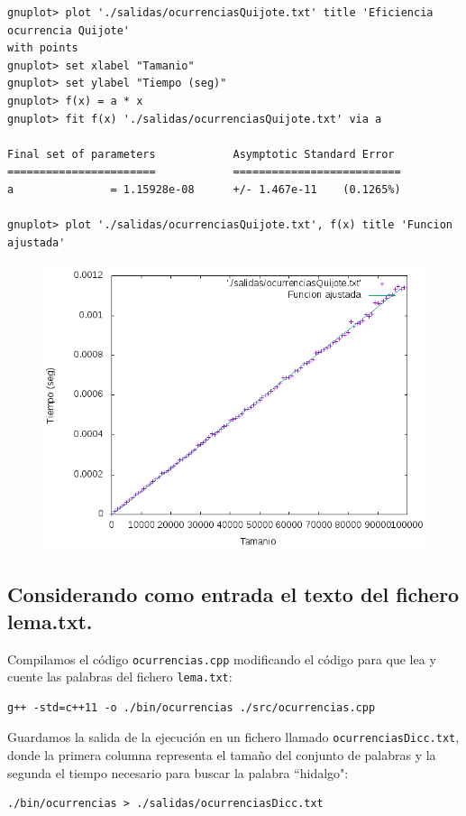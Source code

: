 \documentclass[11pt]{article}
\begin{document}
\begin{verbatim}
gnuplot> plot './salidas/ocurrenciasQuijote.txt' title 'Eficiencia ocurrencia Quijote' 
with points
gnuplot> set xlabel "Tamanio"
gnuplot> set ylabel "Tiempo (seg)"
gnuplot> f(x) = a * x
gnuplot> fit f(x) './salidas/ocurrenciasQuijote.txt' via a

Final set of parameters            Asymptotic Standard Error
=======================            ==========================
a               = 1.15928e-08      +/- 1.467e-11    (0.1265%)

gnuplot> plot './salidas/ocurrenciasQuijote.txt', f(x) title 'Funcion ajustada'
\end{verbatim}

\begin{figure}[H]
\begin{center}
\includegraphics[width=12cm]{../salidas/ocurrenciasQuijote.png}
\end{center}
\end{figure}


\subsection{Considerando como entrada el texto del fichero lema.txt.}

Compilamos el código \texttt{ocurrencias.cpp} modificando el código para que lea y cuente las palabras del fichero \texttt{lema.txt}:
\begin{verbatim}
g++ -std=c++11 -o ./bin/ocurrencias ./src/ocurrencias.cpp
\end{verbatim}

Guardamos la salida de la ejecución en un fichero llamado \texttt{ocurrenciasDicc.txt}, donde la primera columna representa el tamaño del conjunto de palabras y la segunda el tiempo necesario para buscar la palabra ``hidalgo":
\begin{verbatim}
./bin/ocurrencias > ./salidas/ocurrenciasDicc.txt
\end{verbatim}
\end{document}
